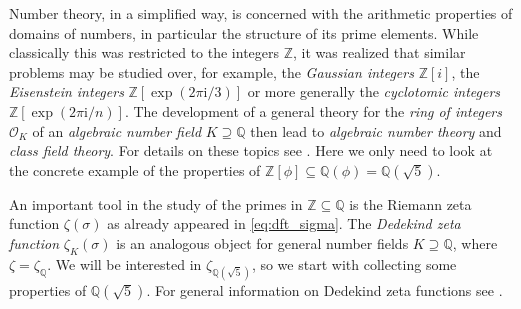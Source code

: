 \documentclass[]{interact}
\newcommand{\bbQ}{\mathbb{Q}}
\newcommand{\bbZ}{\mathbb{Z}}
\newcommand{\cO}{\mathcal{O}}
\newcommand{\sbse}{\subseteq}
\newcommand{\spse}{\supseteq}
\newcommand{\iu}{\mathrm{i}}
\theoremstyle{definition}
\numberwithin{table}{section} %
\numberwithin{figure}{section}
\begin{document}

Number theory, in a simplified way, is concerned with the arithmetic properties of domains of numbers, in particular the structure of its prime elements. While classically this was restricted to the integers $\bbZ$, it was realized that similar problems may be studied over, for example, the \emph{Gaussian integers} $\bbZ[i]$, the \emph{Eisenstein integers} $\bbZ[\exp(2\pi\iu/3)]$ or more generally the \emph{cyclotomic integers} $\bbZ[\exp(2\pi\iu/n)]$. %
The development of a general theory for the \emph{ring of integers} $\cO_K$ of an \emph{algebraic number field} $K \spse \bbQ$ then lead to \emph{algebraic number theory} and \emph{class field theory}. For details on these topics see \cite{Bec14, Chi09, Coh93, Cox89, Mar18, Nar04, Neu99, Was97}. Here we only need to look at the concrete example of the properties of $\bbZ[\phi] \sbse \bbQ(\phi) = \bbQ(\sqrt5)$.

An important tool in the study of the primes in $\bbZ \sbse \bbQ$ is the Riemann zeta function $\zeta(\sigma)$ as already appeared in \eqref{eq:dft_sigma}. The \emph{Dedekind zeta function} $\zeta_K(\sigma)$ is an analogous object for general number fields $K \spse \bbQ$, where $\zeta = \zeta_\bbQ$. We will be interested in $\zeta_{\bbQ(\sqrt5)}$, so we start with collecting some properties of $\bbQ(\sqrt5)$. For general information on Dedekind zeta functions see \cite{Mar18, Nar04, Zag81}.
\end{document}
